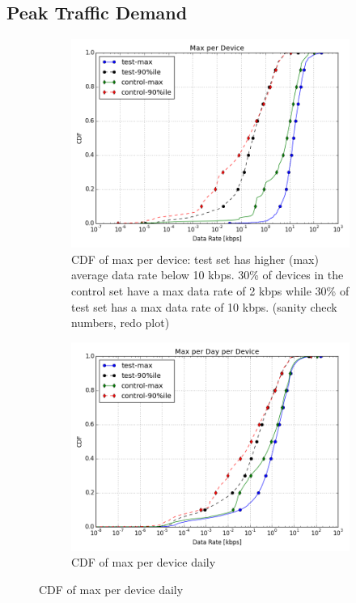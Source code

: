 \subsection{Peak Traffic Demand}\label{subsec:peakratio}

\begin{figure}[ht!]
\begin{minipage}{0.90\linewidth}
\centering
\begin{subfigure}[b]{0.90\linewidth}
\includegraphics[width=\linewidth]{figures/cdf-max-per-device.png}
  \caption{CDF of max per device: test set has higher (max) average data rate 
below 10 kbps.  30\% of devices in the control set have a max data rate of 2 
kbps while 30\% of test set has a max data rate of 10 kbps. (sanity check 
numbers, redo plot)}
  
\label{fig:CDF-data-rate-max}
\end{subfigure}
%
\vspace{-1em}
%
\begin{subfigure}[b]{0.90\linewidth}
\includegraphics[width=\linewidth]{figures/cdf-max-per-day-per-device.png}
  \caption{CDF of max per device daily}
  \vspace{1em}
  

\end{subfigure}
\end{minipage}
\end{figure}
